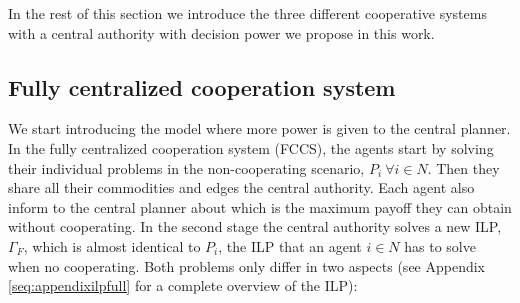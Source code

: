 \documentclass{article}
\begin{document}
In the rest of this section we introduce the three different
cooperative systems with a central authority with decision power we propose in this work.


\subsection{Fully centralized cooperation system}

We start introducing the model where more power is given to the central planner.
In the fully centralized cooperation system (FCCS), the agents start by solving their individual problems in the non-cooperating scenario, $P_i\  \forall i \in N$. Then they share all their commodities and edges the central authority. Each agent also inform to the central planner about which is the maximum payoff they can obtain without cooperating. In the second stage the central authority solves a new ILP, $\Gamma_F$, which is almost identical to $P_ i$, the ILP that an agent $i\in N$ has to solve when no cooperating. Both problems only differ in
two aspects (see Appendix \ref{seq:appendixilpfull} for a complete overview of the ILP):
\end{document}
